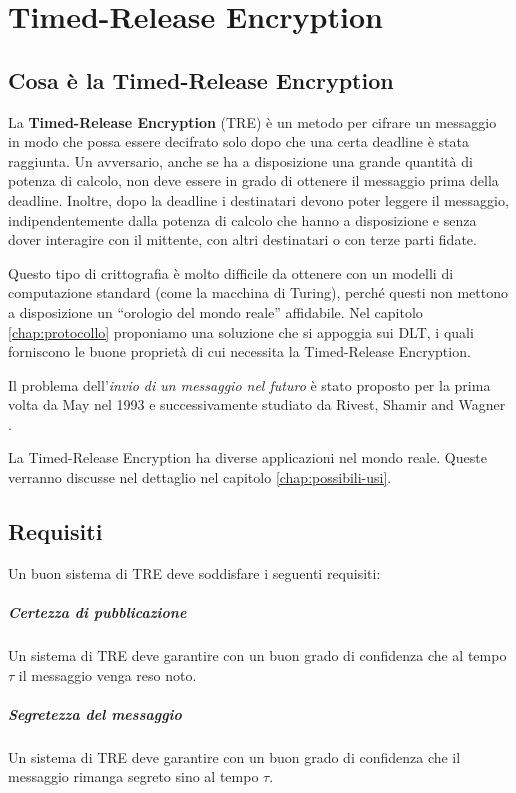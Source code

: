 \chapter{Timed-Release Encryption}

\section{Cosa è la Timed-Release Encryption}
La \textbf{Timed-Release Encryption} (TRE)
è un metodo per cifrare un messaggio in modo che possa
essere decifrato solo dopo che una certa deadline è stata raggiunta.
Un avversario, anche se ha a disposizione una grande quantità di potenza di calcolo,
non deve essere in grado di ottenere il messaggio prima della deadline.
Inoltre, dopo la deadline i destinatari devono poter leggere il messaggio,
indipendentemente dalla potenza di calcolo che hanno a disposizione e
senza dover interagire con il mittente,
con altri destinatari o con terze parti fidate.

Questo tipo di crittografia è molto difficile da ottenere con un modelli
di computazione standard (come la macchina di Turing), perché questi non mettono
a disposizione un ``orologio del mondo reale'' affidabile.
Nel capitolo \ref{chap:protocollo} proponiamo una soluzione che si appoggia sui DLT,
i quali forniscono
le buone proprietà di cui necessita la Timed-Release Encryption.

Il problema dell'\textit{invio di un messaggio nel futuro} è stato proposto per la prima volta
da May \cite{May:time-released-crypto} nel 1993 e
successivamente studiato da Rivest, Shamir and Wagner \cite{Rivest96time-lockpuzzles}.

La Timed-Release Encryption ha diverse applicazioni nel mondo reale. Queste verranno
discusse nel dettaglio nel capitolo \ref{chap:possibili-usi}.

\section{Requisiti}
Un buon sistema di TRE deve soddisfare i seguenti requisiti:

\paragraph{Certezza di pubblicazione}
\label{parag:certezza-pubblicazione}
Un sistema di TRE deve garantire con un buon
grado di confidenza che al tempo $ \tau $ il messaggio venga reso noto.

\paragraph{Segretezza del messaggio}
\label{parag:segretezza-tre}
Un sistema di TRE deve garantire con un buon
grado di confidenza che il messaggio rimanga segreto sino al tempo $ \tau $.


